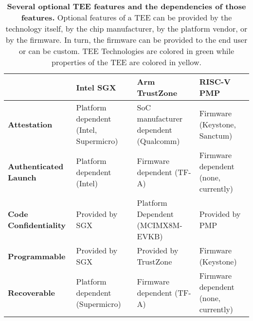 \begin{table*}[p]
\begin{center}
\begin{tabular}{|l|l|l|l|}
\hline
\textbf{}                                  & \cellcolor{tbl-gre}\textbf{Intel SGX} & \cellcolor{tbl-gre}\textbf{Arm TrustZone} & \cellcolor{tbl-gre}\textbf{RISC-V PMP}   \\ \hline
\cellcolor{tbl-yel}\textbf{Attestation}          & Platform dependent (Intel, Supermicro)                        & SoC manufacturer dependent (Qualcomm)                   & Firmware (Keystone, Sanctum)             \\ \hline
\cellcolor{tbl-yel}\textbf{Authenticated Launch} & Platform dependent (Intel)                        & Firmware dependent (TF-A)                            & Firmware dependent (none, currently)          \\ \hline
\cellcolor{tbl-yel}\textbf{Code Confidentiality} & Provided by SGX                            & Platform Dependent  (MCIMX8M-EVKB)                           & Provided by PMP                               \\ \hline
\cellcolor{tbl-yel}\textbf{Programmable}         & Provided by SGX                            & Provided by TrustZone                          & Firmware (Keystone)                      \\ \hline
\cellcolor{tbl-yel}\textbf{Recoverable}          & Platform dependent (Supermicro)                      & Firmware dependent  (TF-A)                          & Firmware dependent (none, currently) \\ \hline
\end{tabular}
\end{center}
\caption[TEE Features and their dependencies]{\textbf{Several optional TEE features and the dependencies of those features.} Optional features of a TEE can be provided by the technology itself, by the chip manufacturer, by the platform vendor, or by the firmware. In turn, the firmware can be provided to the end user or can be custom. TEE Technologies are colored in \colorbox{tbl-gre}{green} while properties of the TEE are colored in \colorbox{tbl-yel}{yellow}.}
\label{tab:tee-compare}
\end{table*}

